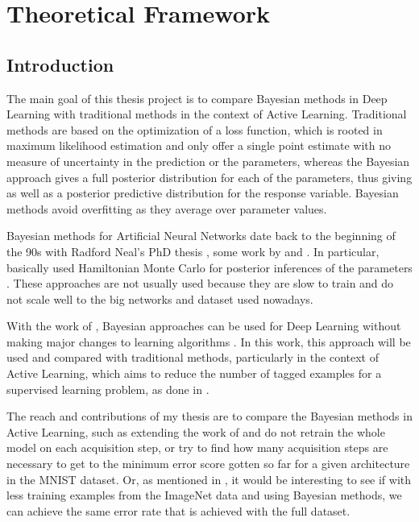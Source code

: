 
\chapter{Theoretical Framework}
\label{ch:theory}


\section{Introduction}

The main goal of this thesis project is to compare Bayesian methods in Deep Learning with traditional methods in the context of Active Learning. Traditional methods are based on the optimization of a loss function, which is rooted in maximum likelihood estimation and only offer a single point estimate with no measure of uncertainty in the prediction or the parameters, whereas the Bayesian approach gives a full posterior distribution for each of the parameters, thus giving as well as a posterior predictive distribution for the response variable. Bayesian methods avoid overfitting as they average over parameter values.

Bayesian methods for Artificial Neural Networks date back to the beginning of the 90s with Radford Neal's PhD thesis \cite{neal1996bayesian}, some work by \citeauthor{denker1991transforming} \cite{denker1991transforming} and \citeauthor{mackay1992practical} \cite{mackay1992practical}. In particular, \citeauthor{neal1996bayesian} basically used Hamiltonian Monte Carlo for posterior inferences of the parameters \cite{neal1996bayesian}. These approaches are not usually used because they are slow to train and do not scale well to the big networks and dataset used nowadays.

With the work of \citeauthor{gal2016uncertainty}, Bayesian approaches can be used for Deep Learning without making major changes to learning algorithms \cite{gal2016uncertainty}. In this work, this approach will be used and compared with traditional methods, particularly in the context of Active Learning, which aims to reduce the number of tagged examples for a supervised learning problem, as done in \cite{Gal2016Active}.

The reach and contributions of my thesis are to compare the Bayesian methods in Active Learning, such as extending the work of \cite{Gal2016Active} and do not retrain the whole model on each acquisition step, or try to find how many acquisition steps are necessary to get to the minimum error score gotten so far for a given architecture in the MNIST dataset. Or, as mentioned in \cite{gal2015bayesian}, it would be interesting to see if with less training examples from the ImageNet data and using Bayesian methods, we can achieve the same error rate that is achieved with the full dataset.



